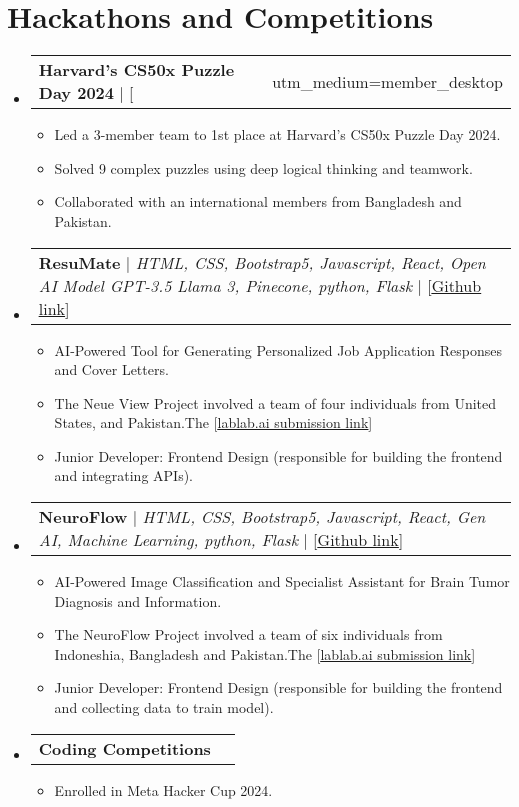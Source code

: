 \documentclass[letterpaper,11pt]{article}
\makeatletter
\newcommand{\resumeItem}[1]{
  \item\small{
    {#1 \vspace{-2pt}}
  }
}
\newcommand{\resumeProjectHeading}[2]{
    \item
    \begin{tabular*}{0.97\textwidth}{l@{\extracolsep{\fill}}r}
      \small#1 & #2 \\
    \end{tabular*}\vspace{-7pt}
}
\newcommand{\resumeSubHeadingListStart}{\begin{itemize}[leftmargin=0.15in, label={}]}
\newcommand{\resumeSubHeadingListEnd}{\end{itemize}}
\newcommand{\resumeItemListStart}{\begin{itemize}}
\newcommand{\resumeItemListEnd}{\end{itemize}\vspace{-5pt}}
\makeatother
\begin{document}
\section{\textbf{Hackathons and Competitions}}
\resumeSubHeadingListStart
\resumeProjectHeading
{\textbf{{Harvard's CS50x Puzzle Day 2024}} $|$ [{\href{https://www.linkedin.com/posts/sikander-nawaz_cs50xabrpuzzleabrdayabr2024-fullabrstackabrdeveloper-activity-7184638208993873920-m-y1?utm_source=share&utm_medium=member_desktop}{\underline{LinkedIn link}}}]}{}
\resumeItemListStart
\resumeItem{Led a 3-member team to 1st place at Harvard's CS50x Puzzle Day 2024.}
\resumeItem{Solved 9 complex puzzles using deep logical thinking and teamwork.}
\resumeItem{Collaborated with an international members from Bangladesh and Pakistan.}
\resumeItemListEnd
\resumeProjectHeading
{\textbf{{ResuMate}} $|$ \emph{HTML, CSS, Bootstrap5, Javascript, React, Open AI Model GPT-3.5 Llama 3, Pinecone, python, Flask} $|$ [{\href{https://github.com/sikander-nawaz/ResuMate}{\underline{Github link}}}]} {}
\resumeItemListStart
\resumeItem{AI-Powered Tool for Generating Personalized Job Application Responses and Cover Letters.}
\resumeItem{The Neue View Project involved a team of four individuals from United States, and Pakistan.The [{\href{https://lablab.ai/event/llama-3-ai-hackathon}{\underline{lablab.ai submission link}}}]}
\resumeItem{Junior Developer: Frontend Design (responsible for building the frontend and integrating APIs).}
\resumeItemListEnd
\resumeProjectHeading
{\textbf{{NeuroFlow}} $|$ \emph{ HTML, CSS, Bootstrap5, Javascript, React, Gen AI, Machine Learning, python, Flask} $|$ [{\href{https://github.com/sikander-nawaz/NeuroFlow}{\underline{Github link}}}]}{}
\resumeItemListStart
\resumeItem{AI-Powered Image Classification and Specialist Assistant for Brain Tumor Diagnosis and Information.}
\resumeItem{The NeuroFlow Project involved a team of six individuals from Indoneshia, Bangladesh and Pakistan.The [{\href{https://lablab.ai/event/langflow-hackathon/ai-the-era/neuroflow}{\underline{lablab.ai submission link}}}]}
\resumeItem{Junior Developer: Frontend Design (responsible for building the frontend and collecting data to train model).}
\resumeItemListEnd
\resumeProjectHeading
{\textbf{{Coding Competitions}}}{}
\resumeItemListStart
\resumeItem{Enrolled in Meta Hacker Cup 2024.}
\resumeItemListEnd
\resumeSubHeadingListEnd
%

\end{document}
